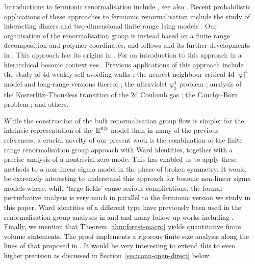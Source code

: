 \documentclass[11pt]{amsart}
\numberwithin{equation}{section}
\numberwithin{theorem}{section}
\newcommand{\1}{{\bf 1}}
\begin{document}
Introductions to fermionic renormalisation include
\cite{MR1380265,MR2414874,MR1658669}, see also
\cite{10.1007/JHEP01(2021)026}.  Recent probabilistic applications of
these approaches to fermionic renormalisation include the study of
interacting dimers \cite{MR3606736,MR4121614} and two-dimensional
finite range Ising models \cite{MR3116322,MR2905796,MR4396672,MR4538288}.  Our
organisation of the renormalisation group
is instead based on a finite range decomposition and
polymer coordinates, and follows \cite{MR2523458}
and its further developments in
\cite{MR3332938,MR3332939,MR3332940,MR3332941,MR3332942,MR3317791,MR2070102,MR3129804}. 
This approach has its origins in \cite{MR1048698}.  For an
introduction to this approach in a hierarchical bosonic context see
\cite{MR3969983}.  Previous applications of this approach include the study of
4d weakly self-avoiding walks \cite{MR3339164,MR3345374}; the
nearest-neighbour critical 4d $|\varphi|^4$ model
\cite{MR3269689,MR3459163} and long-range versions thereof
\cite{MR3772040,MR3723429}; the ultraviolet $\varphi^4_3$ problem
\cite{MR1346375,MR2004988}; analysis of the Kosterlitz--Thousless
transition of the 2d Coulomb gas \cite{MR1777310,MR2917175}; the
Cauchy--Born problem \cite{1910.13564}; and others.

While the construction of the bulk renormalisation group flow is
simpler for the intrinsic representation of the $\mathbb{H}^{0|2}$ model than
in many of the previous references, a crucial
novelty of our present work is the combination of the finite range
renormalisation group approach with Ward identities, together with a
precise analysis of a nontrivial zero mode. 
%
This has enabled us to apply these methods to a non-linear sigma model in the
phase of broken symmetry. It would be extremely interesting to
understand this approach for bosonic non-linear sigma models where,
while
`large fields' cause serious complications, the formal
perturbative analysis is very much in parallel to the fermionic
version we study in this paper.
Ward identities of a
different type have previously been used in the renormalisation group
analyses in \cite{MR880416} and \cite{MR1947693} and many follow-up
works including \cite{MR3606736,MR4121614}.  Finally, we mention that
Theorem~\ref{thm:forest-macro} yields quantitative finite volume
statements. The proof implements a rigorous finite size analysis along
the lines of that proposed in \cite{10.1016/0550-3213(85)90379-7}. It
would be very interesting to extend this to even higher precision as
discussed in Section~\ref{sec:conn-open-direct} below.
\end{document}
